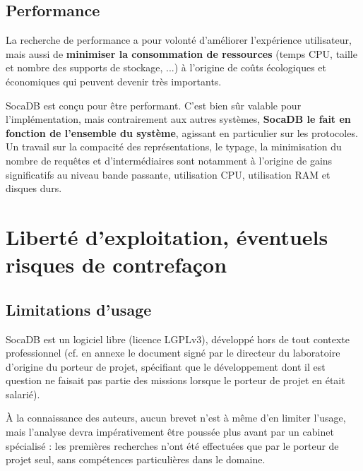 \documentclass[a4paper,10pt]{scrreprt}
\begin{document}

            
        \subsection{Performance}
        
            La recherche de performance a pour volonté d'améliorer l'expérience utilisateur, mais aussi de \textbf{minimiser la consommation de ressources} (temps CPU, taille et nombre des supports de stockage, ...) à l'origine de coûts écologiques et économiques qui peuvent devenir très importants.
        
            \medskip
            SocaDB est conçu pour être performant. C'est bien sûr valable pour l'implémentation, mais contrairement aux autres systèmes, \textbf{SocaDB le fait en fonction de l'ensemble du système}, agissant en particulier sur les protocoles. Un travail sur la compacité des représentations, le typage, la minimisation du nombre de requêtes et d'intermédiaires sont notamment à l'origine de gains significatifs au niveau bande passante, utilisation CPU, utilisation RAM et disques durs.

    \section{Liberté d’exploitation, éventuels risques de contrefaçon}

        \subsection{Limitations d'usage}
        
            SocaDB est un logiciel libre (licence LGPLv3), développé hors de tout contexte professionnel (cf. en annexe le document signé par le directeur du laboratoire d'origine du porteur de projet, spécifiant que le développement dont il est question ne faisait pas partie des missions lorsque le porteur de projet en était salarié).
        
            À la connaissance des auteurs, aucun brevet n'est à même d'en limiter l'usage, mais l'analyse devra impérativement être poussée plus avant par un cabinet spécialisé : les premières recherches n'ont été effectuées que par le porteur de projet seul, sans compétences particulières dans le domaine.
        
\end{document}
